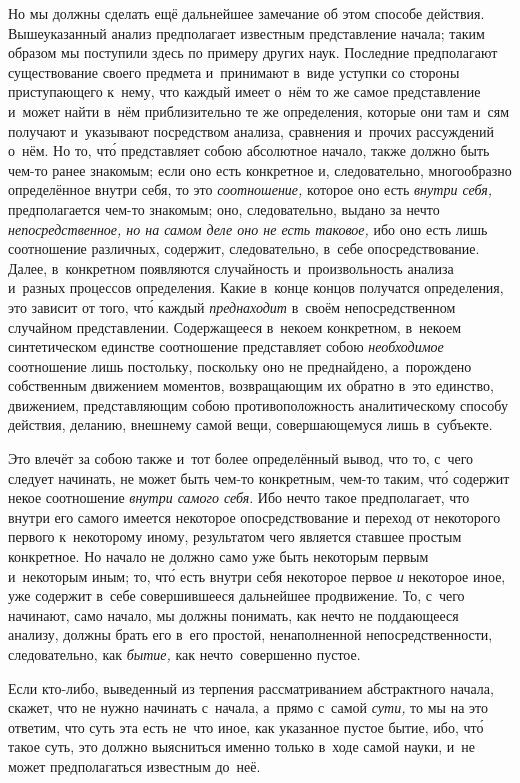 Но мы должны сделать ещё дальнейшее замечание об этом способе действия.
Вышеуказанный анализ предполагает известным представление начала; таким образом
мы поступили здесь по примеру других наук. Последние предполагают существование
своего предмета и~принимают в~виде уступки со стороны приступающего к~нему, что
каждый имеет о~нём то же самое представление и~может найти в~нём приблизительно
те же определения, которые они там и~сям получают и~указывают посредством
анализа, сравнения и~прочих рассуждений о~нём. Но то, чт\'{о} представляет
собою абсолютное начало, также должно быть чем-то ранее знакомым; если оно есть
конкретное и, следовательно, многообразно определённое внутри себя, то это
{\em соотношение,} которое оно есть {\em внутри себя,} предполагается чем-то
знакомым; оно, следовательно, выдано за нечто {\em непосредственное, но на
самом деле оно не есть таковое,} ибо оно есть лишь соотношение различных,
содержит, следовательно, в~себе опосредствование. Далее, в~конкретном
появляются случайность и~произвольность анализа и~разных процессов определения.
Какие в~конце концов получатся определения, это зависит от того, чт\'{о} каждый
{\em преднаходит} в~своём непосредственном случайном представлении.
Содержащееся в~некоем конкретном, в~некоем синтетическом единстве соотношение
представляет собою {\em необходимое} соотношение лишь постольку, поскольку оно
не преднайдено, а~порождено собственным движением моментов, возвращающим их
обратно в~это единство, движением, представляющим собою противоположность
аналитическому способу действия, деланию, внешнему самой вещи, совершающемуся
лишь в~субъекте.

Это влечёт за собою также и~тот более определённый вывод, что то, с~чего
следует начинать, не может быть чем-то конкретным, чем-то таким, чт\'{о}
содержит некое соотношение {\em внутри самого себя}. Ибо нечто такое
предполагает, что внутри его самого имеется некоторое опосредствование и
переход от некоторого первого к~некоторому иному, результатом чего является
ставшее простым конкретное. Но начало не должно само уже быть некоторым первым
и~некоторым иным; то, чт\'{о} есть внутри себя некоторое первое {\em и}
некоторое иное, уже содержит в~себе совершившееся дальнейшее продвижение. То,
с~чего начинают, само начало, мы должны понимать, как нечто не поддающееся
анализу, должны брать его в~его простой, ненаполненной непосредственности,
следовательно, как {\em бытие,} как нечто~совершенно пустое.

Если кто-либо, выведенный из терпения рассматриванием абстрактного начала,
скажет, что не нужно начинать с~начала, а~прямо с~самой {\em сути,} то мы на
это ответим, что суть эта есть не~что иное, как указанное пустое бытие, ибо,
чт\'{о} такое суть, это должно выясниться именно только в~ходе самой науки,
и~не может предполагаться известным до~неё.

